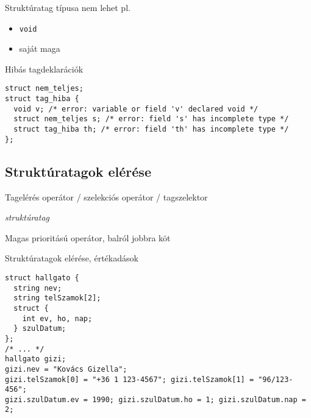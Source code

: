 \documentclass[usenames,dvipsnames,aspectratio=169]{beamer}
\begin{document}
\begin{frame}[fragile]
  Struktúratag típusa nem lehet pl.
  \begin{itemize}
    \item \texttt{void}
    \item saját maga
  \end{itemize}
  \begin{alertblock}{Hibás tagdeklarációk}
    \vspace{-.2cm}
    \begin{verbatim}
struct nem_teljes;
struct tag_hiba {
  void v; /* error: variable or field 'v' declared void */
  struct nem_teljes s; /* error: field 's' has incomplete type */
  struct tag_hiba th; /* error: field 'th' has incomplete type */
};
\end{verbatim}
    \vspace{-.2cm}
  \end{alertblock}
\end{frame}

\subsection{Struktúratagok elérése}
\begin{frame}[fragile]
  Tagelérés operátor / szelekciós operátor / tagszelektor
  \begin{compactitem}
    \item \emph{struktúratag}
    \item Magas prioritású operátor, balról jobbra köt
  \end{compactitem}
  \scriptsize
  \begin{exampleblock}{Struktúratagok elérése, értékadások}
    \vspace{-.2cm}
    \begin{verbatim}
struct hallgato {
  string nev;
  string telSzamok[2];
  struct {
    int ev, ho, nap;
  } szulDatum;
};
/* ... */
hallgato gizi;
gizi.nev = "Kovács Gizella";
gizi.telSzamok[0] = "+36 1 123-4567"; gizi.telSzamok[1] = "96/123-456";
gizi.szulDatum.ev = 1990; gizi.szulDatum.ho = 1; gizi.szulDatum.nap = 2;
\end{verbatim}
    \vspace{-.2cm}
  \end{exampleblock}
\end{frame}

\end{document}
